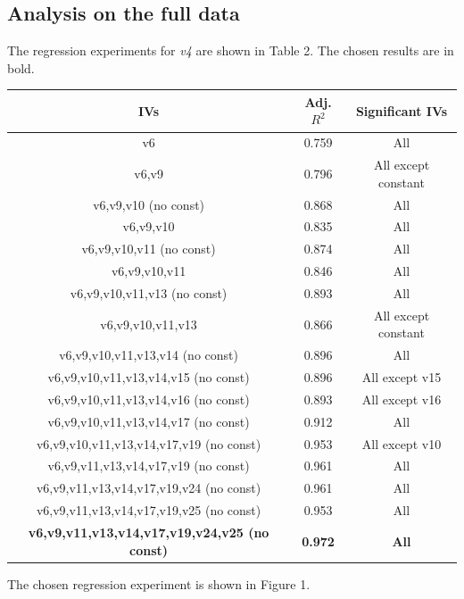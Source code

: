 \documentclass[12pt,a4paper]{article}
\begin{document}
\subsection{Analysis on the full data}
The regression experiments for \textit{v4} are shown in Table 2. The chosen results are in bold.\\

\begin{tabular}{|c|c|c|}
\hline 
\textbf{IVs} & \textbf{Adj. $R^2$} & \textbf{Significant IVs} \\ 
\hline 
v6 & 0.759 & All \\ 
\hline 
v6,v9 & 0.796 & All except constant \\ 
\hline 
v6,v9,v10 (no const) & 0.868 & All \\ 
\hline 
v6,v9,v10 & 0.835 & All \\ 
\hline 
v6,v9,v10,v11 (no const) & 0.874 & All \\ 
\hline 
v6,v9,v10,v11 & 0.846 & All \\ 
\hline 
v6,v9,v10,v11,v13 (no const) & 0.893 & All \\ 
\hline 
v6,v9,v10,v11,v13 & 0.866 & All except constant \\ 
\hline 
v6,v9,v10,v11,v13,v14 (no const) & 0.896 & All \\ 
\hline 
v6,v9,v10,v11,v13,v14,v15 (no const) & 0.896 & All except v15 \\ 
\hline 
v6,v9,v10,v11,v13,v14,v16 (no const) & 0.893 & All except v16 \\ 
\hline 
v6,v9,v10,v11,v13,v14,v17 (no const) & 0.912 & All \\ 
\hline 
v6,v9,v10,v11,v13,v14,v17,v19 (no const) & 0.953 & All except v10 \\ 
\hline 
v6,v9,v11,v13,v14,v17,v19 (no const) & 0.961 & All \\ 
\hline 
v6,v9,v11,v13,v14,v17,v19,v24 (no const) & 0.961 & All \\ 
\hline
v6,v9,v11,v13,v14,v17,v19,v25 (no const) & 0.953 & All \\
\hline
\textbf{v6,v9,v11,v13,v14,v17,v19,v24,v25 (no const)} & \textbf{0.972} & \textbf{All} \\
\hline 
\end{tabular}
\begingroup
{}
\endgroup

The chosen regression experiment is shown in Figure 1.
\end{document}
